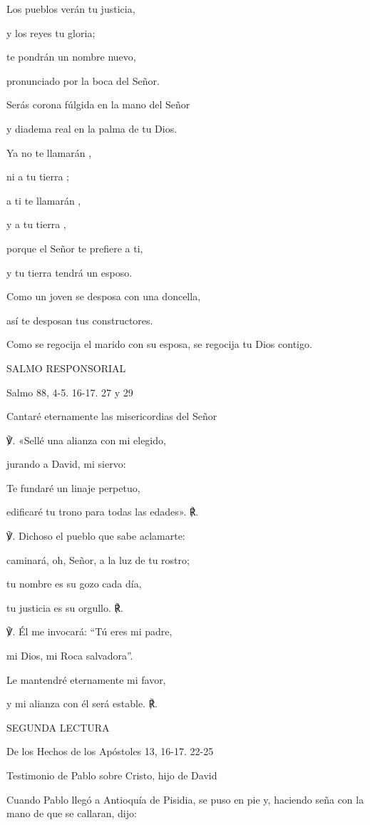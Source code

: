 \begin{body}
\begin{body}
Los pueblos verán tu justicia,

y los reyes tu gloria;

te pondrán un nombre nuevo,

pronunciado por la boca del Señor.

Serás corona fúlgida en la mano del Señor

y diadema real en la palma de tu Dios.

Ya no te llamarán ,

ni a tu tierra ;

a ti te llamarán ,

y a tu tierra ,

porque el Señor te prefiere a ti,

y tu tierra tendrá un esposo.

Como un joven se desposa con una doncella,

así te desposan tus constructores.

Como se regocija el marido con su esposa, se regocija tu Dios contigo.

SALMO RESPONSORIAL

Salmo 88, 4-5. 16-17. 27 y 29

Cantaré eternamente las misericordias del Señor

℣. «Sellé una alianza con mi elegido,

jurando a David, mi siervo:

Te fundaré un linaje perpetuo,

edificaré tu trono para todas las edades». ℟.

℣. Dichoso el pueblo que sabe aclamarte:

caminará, oh, Señor, a la luz de tu rostro;

tu nombre es su gozo cada día,

tu justicia es su orgullo. ℟.

℣. Él me invocará: ``Tú eres mi padre,

mi Dios, mi Roca salvadora''.

Le mantendré eternamente mi favor,

y mi alianza con él será estable. ℟.

SEGUNDA LECTURA

De los Hechos de los Apóstoles 13, 16-17. 22-25

Testimonio de Pablo sobre Cristo, hijo de David

Cuando Pablo llegó a Antioquía de Pisidia, se puso en pie y, haciendo
seña con la mano de que se callaran, dijo:


\end{body}
\end{body}
